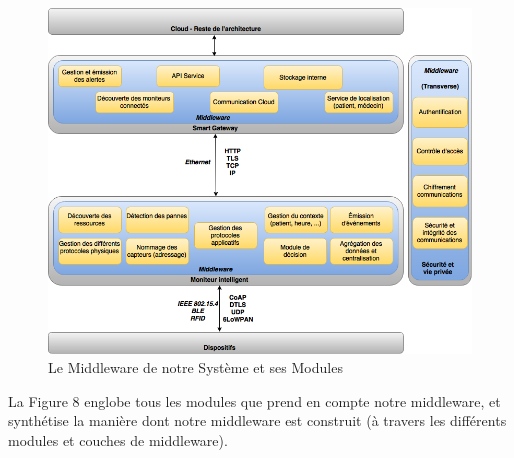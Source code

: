 \begin{figure}[h!]
	\hspace*{-1cm}
	\centering
	\includegraphics[width=1.1\textwidth]{Figure8.png}
	\caption{Le Middleware de notre Système et ses Modules}
	\label{fig:balance}
\end{figure}

La Figure 8 englobe tous les modules que prend en compte notre middleware, et synthétise la manière dont notre middleware est construit (à travers les différents modules et couches de middleware).